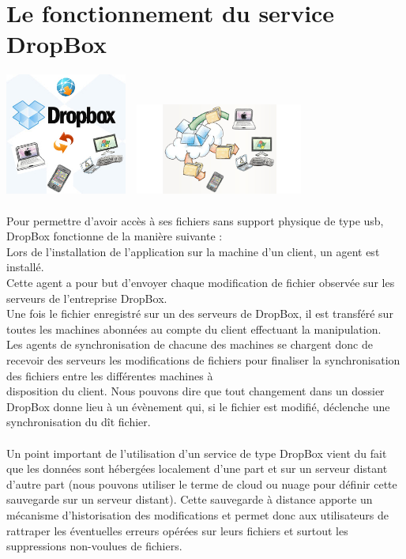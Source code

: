 \documentclass[a4paper, 10pt]{article}
\begin{document}
\section*{Le fonctionnement du service DropBox}
\includegraphics[height = 4cm, width = 4cm]{dropbox_1.png}
\includegraphics[height = 3cm, width = 6cm]{dropbox_3.jpg}\\ \\
Pour permettre d'avoir acc\`es \`a ses fichiers sans support physique de type usb, DropBox fonctionne de la mani\`ere suivante :\\
Lors de l'installation de l'application sur la machine d'un client, un agent est install\'e.\\
Cette agent a pour but d'envoyer chaque modification de fichier observ\'ee sur les serveurs de l'entreprise DropBox.\\
Une fois le fichier enregistr\'e sur un des serveurs de DropBox, il est transf\'er\'e sur toutes les machines abonn\'ees
au compte du client effectuant la manipulation.\\
Les agents de synchronisation de chacune des machines se chargent donc de recevoir des serveurs les modifications de fichiers pour
finaliser la synchronisation des fichiers entre les diff\'erentes machines \`a\\disposition du client.
Nous pouvons dire que tout changement dans un dossier DropBox donne lieu \`a un \'ev\`enement qui, si le fichier est modifi\'e,
d\'eclenche une synchronisation du d\^it fichier.\\ \\
Un point important de l'utilisation d'un service de type DropBox vient du fait que les donn\'ees sont h\'eberg\'ees localement d'une part
et sur un serveur distant d'autre part (nous pouvons utiliser le terme de cloud ou nuage pour d\'efinir cette sauvegarde sur un serveur distant).
Cette sauvegarde \`a distance apporte un m\'ecanisme d'historisation des modifications et 
permet donc aux utilisateurs de rattraper les \'eventuelles erreurs op\'er\'ees sur leurs fichiers et
surtout les suppressions non-voulues de fichiers.
\end{document}
